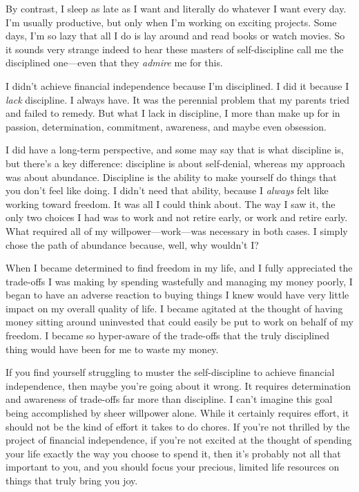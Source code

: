By contrast, I sleep as late as I want and literally do whatever I want every day. I'm usually productive, but only when I'm working on exciting projects. Some days, I'm so lazy that all I do is lay around and read books or watch movies. So it sounds very strange indeed to hear these masters of self-discipline call me the disciplined one---even that they \emph{admire} me for this.

I didn't achieve financial independence because I'm disciplined. I did it because I \emph{lack} discipline. I always have. It was the perennial problem that my parents tried and failed to remedy. But what I lack in discipline, I more than make up for in passion, determination, commitment, awareness, and maybe even obsession.

I did have a long-term perspective, and some may say that is what discipline is, but there's a key difference: discipline is about self-denial, whereas my approach was about abundance. Discipline is the ability to make yourself do things that you don't feel like doing. I didn't need that ability, because I \emph{always} felt like working toward freedom. It was all I could think about. The way I saw it, the only two choices I had was to work and not retire early, or work and retire early. What required all of my willpower---work---was necessary in both cases. I simply chose the path of abundance because, well, why wouldn't I?

When I became determined to find freedom in my life, and I fully appreciated the trade-offs I was making by spending wastefully and managing my money poorly, I began to have an adverse reaction to buying things I knew would have very little impact on my overall quality of life. I became agitated at the thought of having money sitting around uninvested that could easily be put to work on behalf of my freedom. I became so hyper-aware of the trade-offs that the truly disciplined thing would have been for me to waste my money.

If you find yourself struggling to muster the self-discipline to achieve financial independence, then maybe you're going about it wrong. It requires determination and awareness of trade-offs far more than discipline. I can't imagine this goal being accomplished by sheer willpower alone. While it certainly requires effort, it should not be the kind of effort it takes to do chores. If you're not thrilled by the project of financial independence, if you're not excited at the thought of spending your life exactly the way you choose to spend it, then it's probably not all that important to you, and you should focus your precious, limited life resources on things that truly bring you joy.

